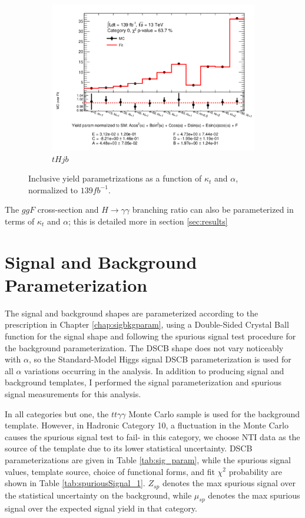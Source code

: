 \begin{figure}[htp]
\begin{subfigure}[b]{0.3\textwidth}
         \includegraphics[width=\textwidth]{figures/tthcp_results/yield_tHjb_0.pdf}
         \caption{$tHjb$}
         \label{fig:tHjbYield}
     \end{subfigure}
     \hfill
  \label{fig:YieldParams}
  \caption{Inclusive yield parametrizations as a function of $\kappa_{t}$ and $\alpha$, normalized to $139 fb^{-1}$.}  
\end{figure}


The $ggF$ cross-section and $H \rightarrow \gamma \gamma$ branching ratio can also be parameterized in terms of $\kappa_{t}$ and $\alpha$; this is detailed more in section \ref{sec:results}

\section{Signal and Background Parameterization}

The signal and background shapes are parameterized according to the prescription in Chapter \ref{chap:sigbkgparam}, using a Double-Sided Crystal Ball function for the signal shape and following the spurious signal test procedure for the background parameterization. The DSCB shape does not vary noticeably with $\alpha$, so the Standard-Model Higgs signal DSCB parameterization is used for all $\alpha$ variations occurring in the analysis. In addition to producing signal and background templates, I performed the signal parameterization and spurious signal measurements for this analysis.

In all categories but one, the $tt\gamma\gamma$ Monte Carlo sample is used for the background template. However, in Hadronic Category 10, a fluctuation in the Monte Carlo causes the spurious signal test to fail- in this category, we choose NTI data as the source of the template due to its lower statistical uncertainty. DSCB parameterizations are given in Table \ref{tab:sig_param}, while the spurious signal values, template source, choice of functional forms, and fit $\chi^{2}$ probability are shown in Table \ref{tab:spuriousSignal_1}. $Z_{sp}$ denotes the max spurious signal over the statistical uncertainty on the background, while $\mu_{sp}$ denotes the max spurious signal over the expected signal yield in that category.


